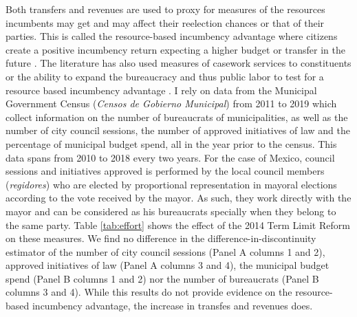 Both transfers and revenues are used to proxy for measures of the resources incumbents may get and may affect their reelection chances or that of their parties. This is called the resource-based incumbency advantage where citizens create a positive incumbency return expecting a higher budget or transfer in the future \citep{cox_morgensten_1993}. The literature has also used measures of casework services to constituents or the ability to expand the bureaucracy and thus public labor to test for a resource based incumbency advantage \citep{cox_katz_1996}. I rely on data from the Municipal Government Census (\emph{Censos de Gobierno Municipal}) from 2011 to 2019 which collect information on the number of bureaucrats of municipalities, as well as the number of city council sessions, the number of approved initiatives of law and the percentage of municipal budget spend, all in the year prior to the census. This data spans from 2010 to 2018 every two years. For the case of Mexico, council sessions and initiatives approved is performed by the local council members (\emph{regidores}) who are elected by proportional representation in mayoral elections according to the vote received by the mayor. As such, they work directly with the mayor and can be considered as his bureaucrats specially when they belong to the same party. Table \ref{tab:effort} shows the effect of the 2014 Term Limit Reform on these  measures. We find no difference in the difference-in-discontinuity estimator of the number of city council sessions (Panel A columns 1 and 2), approved initiatives of law (Panel A columns 3 and 4), the municipal budget spend (Panel B columns 1 and 2) nor the number of bureaucrats (Panel B columns 3 and 4). While this results do not provide evidence on the resource-based incumbency advantage, the increase in transfes and revenues does. 
   
